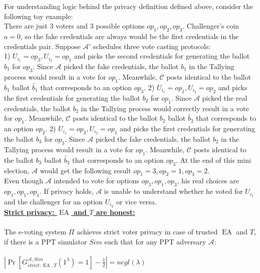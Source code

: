 \documentclass[12pt]{article}
\DeclareMathOperator{\ea}{EA}
\begin{document}
For understanding logic behind the privacy definition defined above, consider the following toy example:\\
There are just 3 voters and 3 possible options $op_1,op_2,op_3$. Challenger's coin $a=0$, so the fake credentials are always would be the first credentials in the credentials pair.
Suppose  $\mathcal{A}$' schedules three vote casting protocols: \\
1) $U_{i_1} = op_3, U_{i_2} = op_1$ and picks the second credentials for generating the ballot $b_1$ for $op_3$. Since  $\mathcal{A}$ picked the fake credentials, the ballot $b_1$ in the Tallying process would result in a vote for $op_1$. Meanwhile, $\mathcal{C}$ posts identical to the ballot $b_1$ ballot $\tilde{b_1}$ that corresponds to an option $op_3$.
2) $U_{i_1} = op_1, U_{i_2} = op_2$ and picks the first credentials for generating the ballot $b_2$ for $op_1$. Since  $\mathcal{A}$ picked the real credentials, the ballot $b_2$ in the Tallying process would correctly result in a vote for $op_1$. Meanwhile, $\mathcal{C}$ posts identical to the ballot $b_2$ ballot $\tilde{b_2}$ that corresponds to an option $op_2$.
2) $U_{i_1} = op_3, U_{i_2} = op_1$ and picks the first credentials for generating the ballot $b_3$ for $op_3$. Since  $\mathcal{A}$ picked the fake credentials, the ballot $b_2$ in the Tallying process would  result in a vote for $op_1$. Meanwhile, $\mathcal{C}$ posts identical to the ballot $b_3$ ballot $\tilde{b_3}$ that corresponds to an option $op_3$.
At the end of this mini election,  $\mathcal{A}$ would get the following result $op_1 = 3, op_2 = 1, op_3 = 2$. \\
Even though  $\mathcal{A}$ intended to vote for options $op_3,op_1,op_3$, his real choices are $op_1,op_1,op_1$. If privacy holds, $\mathcal{A}$  is unable to understand whether he voted for $U_{i_1}$ and the challenger for an option $U_{i_2}$ or vice versa. \\

\underline{\textbf{Strict privacy: $\ea$ and $T$ are honest:}}\\\\
The e-voting system $\Pi$ achieves strict voter privacy in case of trusted $\ea$ and $T$, if there is a PPT simulator $Sim$ such that for any PPT adversary $\mathcal{A}$:\\\\
 $|\Pr[G_{strict,\ea,T}^{\mathcal{A}, Sim}(1^{\lambda}) = 1]- \frac{1}{2} |= negl(\lambda)$
\end{document}
